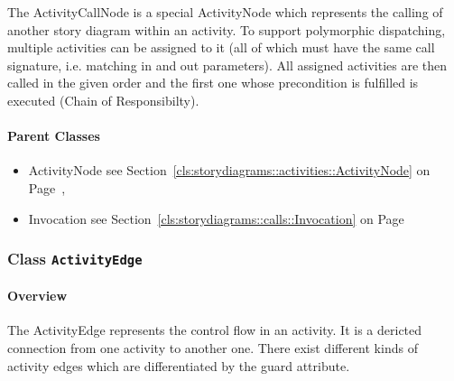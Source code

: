 The ActivityCallNode is a special ActivityNode which represents the calling of another story diagram within an activity.
To support polymorphic dispatching, multiple activities can be assigned to it (all of which must have the same call signature, i.e. matching in and out parameters). All assigned activities are then called in the given order and the first one whose precondition is fulfilled is executed (Chain of Responsibilty).	
		
	



\paragraph{Parent Classes}
\begin{itemize}
\item ActivityNode see Section~\ref{cls:storydiagrams::activities::ActivityNode} on Page~\pageref{cls:storydiagrams::activities::ActivityNode}, \item Invocation see Section~\ref{cls:storydiagrams::calls::Invocation} on Page~\pageref{cls:storydiagrams::calls::Invocation}\end{itemize}
\subsubsection{\Large{Class \bfseries \texttt{ActivityEdge}\normalfont}}
\label{cls:storydiagrams::activities::ActivityEdge} 
\paragraph{Overview}

	
			
The ActivityEdge represents the control flow in an activity. It is a dericted connection from one activity to another one. There exist different kinds of activity edges which are differentiated by the guard attribute.	
		
	


